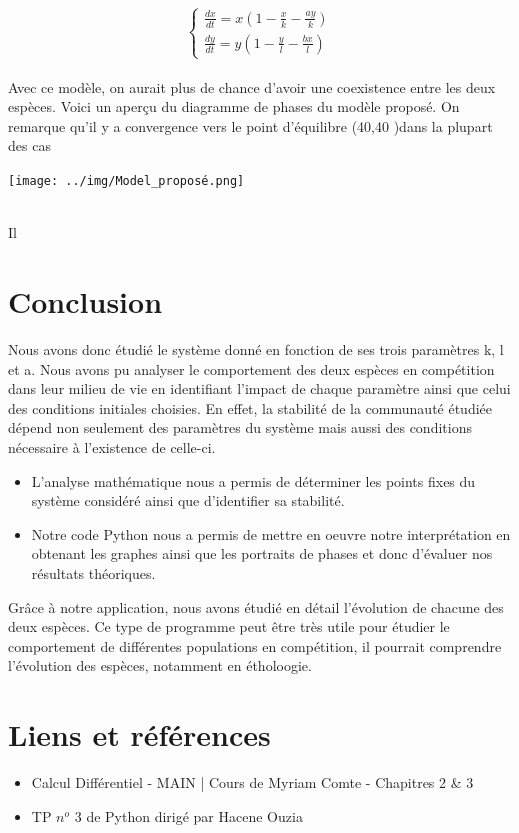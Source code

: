 \documentclass{article}
\begin{document}
\begin{equation*}
\left\{
\begin{array}{ll}
    \frac{dx}{dt} =  x(1 - \frac{x}{k} - \frac{a y}{k}) \\
    \frac{dy}{dt} = y(1- \frac{y}{l} - \frac{b x}{l})
\end{array}
\right.
\end{equation*}\\
\noindent
Avec ce modèle, on aurait plus de chance d'avoir une coexistence entre les deux espèces. Voici un aperçu du diagramme de phases du modèle proposé. On remarque qu'il y a convergence vers le point d'équilibre (40,40 )dans la plupart des cas\\
\begin{center}
    \texttt{[image: ../img/Model\_proposé.png]}
\end{center}\\
Il 

\newpage
\setcounter{secnumdepth}{0}
\section{Conclusion}
Nous avons donc étudié le système donné en fonction de ses trois paramètres k, l et a. Nous avons pu analyser le comportement des deux espèces en compétition dans leur milieu de vie en identifiant l'impact de chaque paramètre ainsi que celui des conditions initiales choisies. En effet, la stabilité de la communauté étudiée dépend non seulement des paramètres du système mais aussi des conditions nécessaire à l'existence de celle-ci.
\begin{itemize}
    \item L'analyse mathématique nous a permis de déterminer les points fixes du système considéré ainsi que d'identifier sa stabilité.
    \item Notre code Python nous a permis de mettre en oeuvre notre interprétation en obtenant les graphes ainsi que les portraits de phases et donc d'évaluer nos résultats théoriques.
\end{itemize}
Grâce à notre application, nous avons étudié en détail l'évolution de chacune des deux espèces. Ce type de programme peut être très utile pour étudier le comportement de différentes populations en compétition, il pourrait comprendre l'évolution des espèces, notamment en étholoogie.

\vfill
\section{Liens et références}
\begin{itemize}[label=\textbullet]
    \vspace{0.3cm}
    \item Calcul Différentiel - MAIN | Cours de Myriam Comte - Chapitres 2 \& 3\\
    \item TP $n^o$ 3 de Python dirigé par Hacene Ouzia
\end{itemize}
\vfill \vfill
\end{document}
